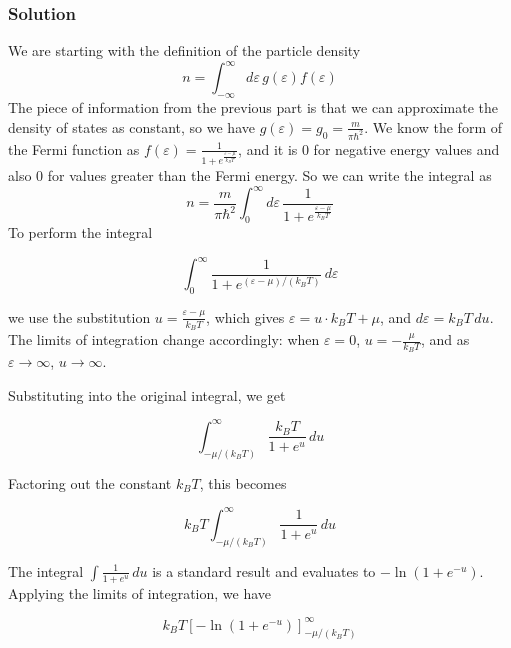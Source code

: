 \documentclass[12pt]{article}
\begin{document}
\subsubsection{Solution}
We are starting with the definition of the particle density
\begin{equation}
    n = \int_{-\infty}^{\infty} d \varepsilon \, g(\varepsilon) f(\varepsilon)
\end{equation}
The piece of information from the previous part is that we can approximate the density of states as constant, so we have \( g(\varepsilon) = g_0 = \frac{m}{\pi \hbar^2} \). We know the form of the Fermi function as \( f(\varepsilon) = \frac{1}{1 + e^{\frac{\varepsilon - \mu}{k_B T}}} \), and it is 0 for negative energy values and also 0 for values greater than the Fermi energy. So we can write the integral as
\begin{equation}
    n = \frac{m}{\pi \hbar^2}\int_{0}^{\infty} d \varepsilon \, \frac{1}{1 + e^{\frac{\varepsilon - \mu}{k_B T}}}
\end{equation}
To perform the integral

\[
\int_0^\infty \frac{1}{1 + e^{(\varepsilon - \mu) / (k_B T)}} \, d\varepsilon
\]

we use the substitution \( u = \frac{\varepsilon - \mu}{k_B T} \), which gives \( \varepsilon = u \cdot k_B T + \mu \), and \( d\varepsilon = k_B T \, du \). The limits of integration change accordingly: when \( \varepsilon = 0 \), \( u = -\frac{\mu}{k_B T} \), and as \( \varepsilon \to \infty \), \( u \to \infty \).

Substituting into the original integral, we get

\[
\int_{-\mu/(k_B T)}^{\infty} \frac{k_B T}{1 + e^u} \, du
\]

Factoring out the constant \( k_B T \), this becomes

\[
k_B T \int_{-\mu/(k_B T)}^{\infty} \frac{1}{1 + e^u} \, du
\]

The integral \( \int \frac{1}{1 + e^u} \, du \) is a standard result and evaluates to \( -\ln(1 + e^{-u}) \). Applying the limits of integration, we have

\[
k_B T \left[ -\ln(1 + e^{-u}) \right]_{-\mu/(k_B T)}^{\infty}
\]
\end{document}
